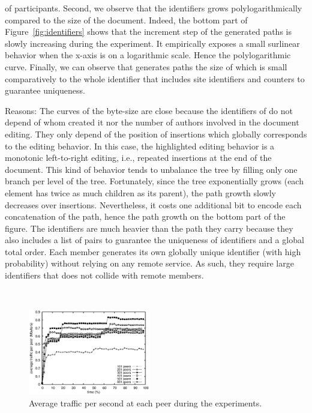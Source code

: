 \begin{asparadesc}
  of participants. Second, we observe that the identifiers grows
  polylogarithmically compared to the size of the document. Indeed, the bottom
  part of Figure~\ref{fig:identifiers} shows that the increment step of the
  generated paths is slowly increasing during the experiment. It empirically
  exposes a small surlinear behavior when the x-axis is on a logarithmic
  scale. Hence the polylogarithmic curve. Finally, we can observe that \LSEQ
  generates paths the size of which is small comparatively to the whole
  identifier that includes site identifiers and counters to guarantee
  uniqueness.
\item [Reasons:] The curves of the byte-size are close because the identifiers
  of \LSEQ do not depend of whom created it nor the number of authors involved
  in the document editing. They only depend of the position of insertions which
  globally corresponds to the editing behavior. In this case, the highlighted
  editing behavior is a monotonic left-to-right editing, i.e., repeated
  insertions at the end of the document. This kind of behavior tends to
  unbalance the tree by filling only one branch per level of the
  tree. Fortunately, since the tree exponentially grows (each element has twice
  as much children as its parent), the path growth slowly decreases over
  insertions. Nevertheless, it costs one additional bit to encode each
  concatenation of the path, hence the path growth on the bottom part of the
  figure. The identifiers are much heavier than the path they carry because they
  also includes a list of pairs to guarantee the uniqueness of identifiers and a
  global total order. Each member generates its own globally unique identifier
  (with high probability) without relying on any remote service. As such, they
  require large identifiers that does not collide with remote members.
\end{asparadesc}

\ \\

\begin{figure}
  \centering
  \includegraphics[width=0.475\textwidth]{./img/traffic.eps}
  \caption{\label{fig:traffic} Average traffic per second at each peer
    during the experiments.}
\end{figure}

